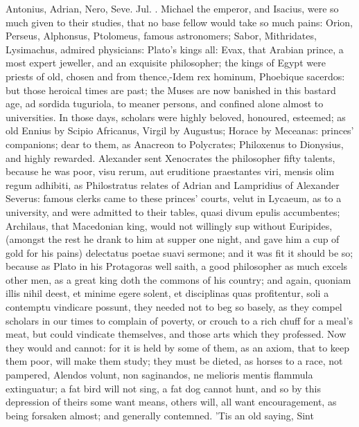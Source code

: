 {Antonius, Adrian, Nero, Seve. Jul. \etc{}. Michael the emperor,
and Isacius, were so much given to their studies, that no base fellow
would take so much pains: Orion, Perseus, Alphonsus, Ptolomeus, famous
astronomers; Sabor, Mithridates, Lysimachus, admired physicians:
Plato's kings all: Evax, that Arabian prince, a most expert jeweller,
and an exquisite philosopher; the kings of Egypt were priests of old,
chosen and from thence,-Idem rex hominum, Phoebique sacerdos: but those
heroical times are past; the Muses are now banished in this bastard
age, ad sordida tuguriola, to meaner persons, and confined alone almost
to universities. In those days, scholars were highly beloved,
honoured, esteemed; as old Ennius by Scipio Africanus, Virgil by
Augustus; Horace by Meceanas: princes' companions; dear to them, as
Anacreon to Polycrates; Philoxenus to Dionysius, and highly rewarded.
Alexander sent Xenocrates the philosopher fifty talents, because he was
poor, visu rerum, aut eruditione praestantes viri, mensis olim regum
adhibiti, as Philostratus relates of Adrian and Lampridius of Alexander
Severus: famous clerks came to these princes' courts, velut in Lycaeum,
as to a university, and were admitted to their tables, quasi divum
epulis accumbentes; Archilaus, that Macedonian king, would not
willingly sup without Euripides, (amongst the rest he drank to him at
supper one night, and gave him a cup of gold for his pains) delectatus
poetae suavi sermone; and it was fit it should be so; because as
Plato in his Protagoras well saith, a good philosopher as much
excels other men, as a great king doth the commons of his country; and
again, quoniam illis nihil deest, et minime egere solent, et
disciplinas quas profitentur, soli a contemptu vindicare possunt, they
needed not to beg so basely, as they compel scholars in our times
to complain of poverty, or crouch to a rich chuff for a meal's meat,
but could vindicate themselves, and those arts which they professed.
Now they would and cannot: for it is held by some of them, as an axiom,
that to keep them poor, will make them study; they must be dieted, as
horses to a race, not pampered, Alendos volunt, non saginandos,
ne melioris mentis flammula extinguatur; a fat bird will not sing, a
fat dog cannot hunt, and so by this depression of theirs some
want means, others will, all want encouragement, as being
forsaken almost; and generally contemned. 'Tis an old saying, Sint
}
